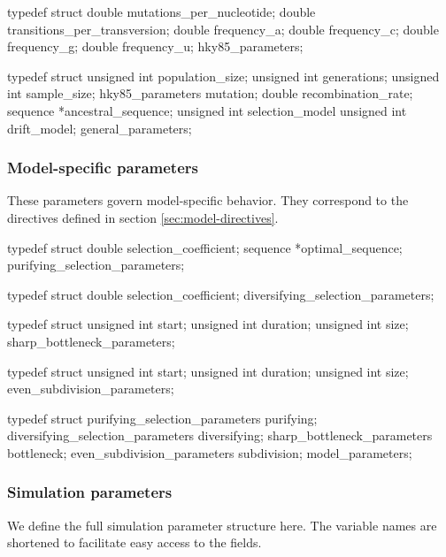 \documentclass{article}
\begin{document}
\begin{ccode}
typedef struct {
  double		mutations_per_nucleotide;
  double		transitions_per_transversion;
  double		frequency_a;
  double		frequency_c;
  double		frequency_g;
  double		frequency_u;
} hky85_parameters;

typedef struct {
  unsigned int		population_size;
  unsigned int		generations;
  unsigned int		sample_size;
  hky85_parameters	mutation;
  double		recombination_rate;
  sequence		*ancestral_sequence;
  unsigned int		selection_model
  unsigned int		drift_model;
} general_parameters;
\end{ccode}

      \subsubsection{Model-specific parameters}
	\label{sec:model-parameters}

	These parameters govern model-specific behavior. They correspond to the
	directives defined in section \ref{sec:model-directives}.

\begin{ccode}
typedef struct {
  double		selection_coefficient;
  sequence		*optimal_sequence;
} purifying_selection_parameters;

typedef struct {
  double		selection_coefficient;
} diversifying_selection_parameters;

typedef struct {
  unsigned int		start;
  unsigned int		duration;
  unsigned int		size;
} sharp_bottleneck_parameters;

typedef struct {
  unsigned int		start;
  unsigned int		duration;
  unsigned int		size;
} even_subdivision_parameters;

typedef struct {
  purifying_selection_parameters	purifying;
  diversifying_selection_parameters	diversifying;
  sharp_bottleneck_parameters		bottleneck;
  even_subdivision_parameters		subdivision;
} model_parameters;
\end{ccode}

      \subsubsection{Simulation parameters}
	\label{sec:simulation-parameter-complete}

	We define the full simulation parameter structure here. The variable
	names are shortened to facilitate easy access to the fields.
\end{document}
